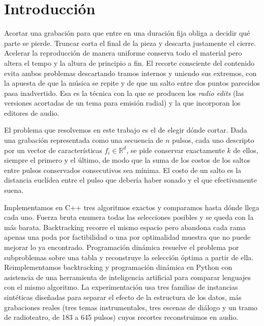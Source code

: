 \section{Introducción}
\label{sec:introduccion}

Acortar una grabación para que entre en una duración fija obliga a decidir qué parte se pierde. Truncar corta el final de la pieza y descarta justamente el cierre. Acelerar la reproducción de manera uniforme conserva todo el material pero altera el tempo y la altura de principio a fin. El recorte consciente del contenido \cite{wenner2013} evita ambos problemas descartando tramos internos y uniendo sus extremos, con la apuesta de que la música se repite y de que un salto entre dos puntos parecidos pasa inadvertido. Esa es la técnica con la que se producen los \emph{radio edits} (las versiones acortadas de un tema para emisión radial) y la que incorporan los editores de audio.

El problema que resolvemos en este trabajo es el de elegir dónde cortar. Dada una grabación representada como una secuencia de $n$ pulsos, cada uno descripto por un vector de características $f_i \in \mathbb{R}^d$, se pide conservar exactamente $k$ de ellos, siempre el primero y el último, de modo que la suma de los costos de los saltos entre pulsos conservados consecutivos sea mínima. El costo de un salto es la distancia euclídea entre el pulso que debería haber sonado y el que efectivamente suena.

Implementamos en C++ tres algoritmos exactos y comparamos hasta dónde llega cada uno. Fuerza bruta enumera todas las selecciones posibles y se queda con la más barata. Backtracking recorre el mismo espacio pero abandona cada rama apenas una poda por factibilidad o una por optimalidad muestra que no puede mejorar lo ya encontrado. Programación dinámica resuelve el problema por subproblemas sobre una tabla y reconstruye la selección óptima a partir de ella. Reimplementamos backtracking y programación dinámica en Python con asistencia de una herramienta de inteligencia artificial para comparar lenguajes con el mismo algoritmo. La experimentación usa tres familias de instancias sintéticas diseñadas para separar el efecto de la estructura de los datos, más grabaciones reales (tres temas instrumentales, tres escenas de diálogo y un tramo de radioteatro, de 183 a 645 pulsos) cuyos recortes reconstruimos en audio.

